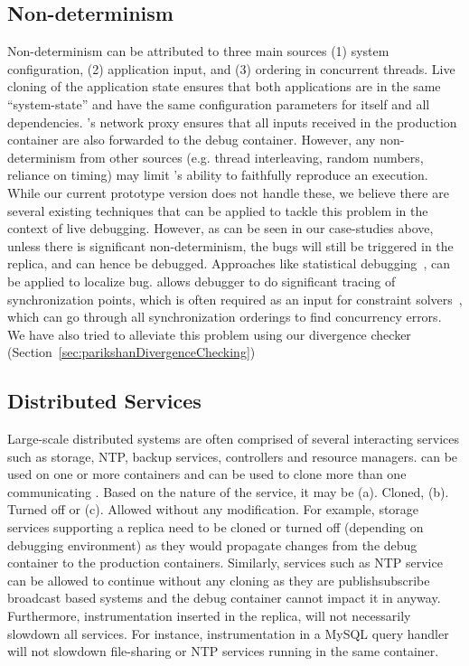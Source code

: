 \subsection{Non-determinism} 
\label{sec:parikshanThreatsNonDeterminism}
Non-determinism can be attributed to three main sources (1) system configuration, (2) application input, and (3) ordering in concurrent threads.
Live cloning of the application state ensures that both applications are in the same ``system-state'' and have the same configuration parameters for itself and all dependencies.
\parikshan's network proxy ensures that all inputs received in the production container are also forwarded to the debug container.
However, any non-determinism from other sources (e.g. thread interleaving, random numbers, reliance on timing) may limit \parikshan's ability to faithfully reproduce an execution. 
While our current prototype version does not handle these, we believe there are several existing techniques that can be applied to tackle this problem in the context of live debugging.
However, as can be seen in our case-studies above, unless there is significant non-determinism, the bugs will still be triggered in the replica, and can hence be debugged. 
Approaches like statistical debugging~\cite{Liblit:2004:CBI}, can be applied to localize bug.
\parikshan allows debugger to do significant tracing of synchronization points, which is often required as an input for constraint solvers~\cite{dpor,best}, which can go through all synchronization orderings to find concurrency errors.
We have also tried to alleviate this problem using our divergence checker (Section~\ref{sec:parikshanDivergenceChecking})


\subsection{Distributed Services} 
\label{sec:parikshanThreatsDirstributed}

Large-scale distributed systems are often comprised of several interacting services such as storage, NTP, backup services, controllers and resource managers.
\parikshan can be used on one or more containers and can be used to clone more than one communicating .
Based on the nature of the service, it may be (a). Cloned, (b). Turned off or (c). Allowed without any modification.
For example, storage services supporting a replica need to be cloned or turned off (depending on debugging environment) as they would propagate changes from the debug container to the production containers.
Similarly, services such as NTP service can be allowed to continue without any cloning as they are publish\/subscribe broadcast based systems and the debug container cannot impact it in anyway.
Furthermore, instrumentation inserted in the replica, will not necessarily slowdown all services.
For instance, instrumentation in a MySQL query handler will not slowdown file-sharing or NTP services running in the same container.
